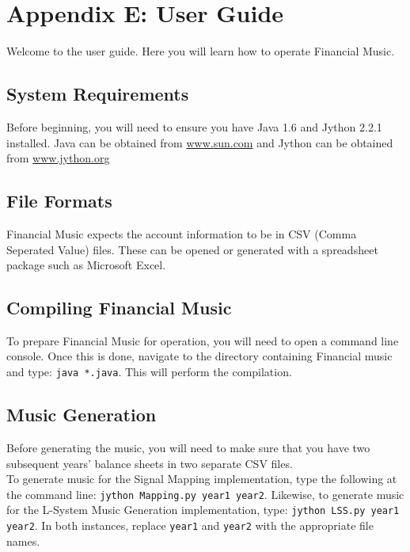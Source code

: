 \section{Appendix E: User Guide}

Welcome to the user guide. Here you will learn how to operate Financial Music.

\subsection*{System Requirements}

Before beginning, you will need to ensure you have Java 1.6 and Jython 2.2.1 installed. Java can be obtained from \url{www.sun.com} and Jython can be obtained from \url{www.jython.org}

\subsection*{File Formats}

Financial Music expects the account information to be in CSV (Comma Seperated Value) files. These can be opened or generated with a spreadsheet package such as Microsoft Excel.

\subsection*{Compiling Financial Music}

To prepare Financial Music for operation, you will need to open a command line console. Once this is done, navigate to the directory containing Financial music and type: \texttt{java *.java}. This will perform the compilation.

\subsection*{Music Generation}

Before generating the music, you will need to make sure that you have two subsequent years' balance sheets in two separate CSV files.\\

To generate music for the Signal Mapping implementation, type the following at the command line: \texttt{jython Mapping.py year1 year2}. Likewise, to generate music for the L-System Music Generation implementation, type: \texttt{jython LSS.py year1 year2}. In both instances, replace \texttt{year1} and \texttt{year2} with the appropriate file names.

